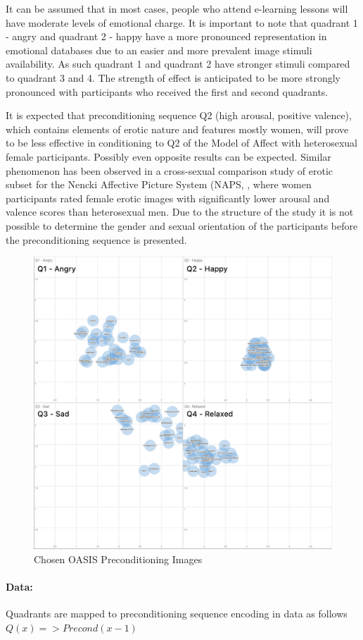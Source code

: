 It can be assumed that in most cases, people who attend e-learning lessons will have moderate levels of emotional charge. It is important to note that quadrant 1 - angry and quadrant 2 - happy have a more pronounced representation in emotional databases due to an easier and more prevalent image stimuli availability. As such quadrant 1 and quadrant 2 have stronger stimuli compared to quadrant 3 and 4. The strength of effect is anticipated to be more strongly pronounced with participants who received the first and second quadrants.

It is expected that preconditioning sequence Q2 (high arousal, positive valence), which contains elements of erotic nature and features mostly women, will prove to be less effective in conditioning to Q2 of the Model of Affect with heterosexual female participants. Possibly even opposite results can be expected. Similar phenomenon has been observed in a cross-sexual comparison study of erotic subset for the Nencki Affective Picture System (NAPS, \cite{Wierzba2015}, where women participants rated female erotic images with significantly lower arousal and valence scores than heterosexual men. Due to the structure of the study it is not possible to determine the gender and sexual orientation of the participants before the preconditioning sequence is presented.






\begin{figure}[h!]
	\centering
	\includegraphics[width=1\linewidth]{graphics/All_Preconditionings}
	\caption{Chosen OASIS Preconditioning Images}
	\label{fig:allpreconditionings}
\end{figure}


\paragraph{Data:} Quadrants are mapped to preconditioning sequence encoding in data as follows \(Q(x) => Precond(x-1)\)